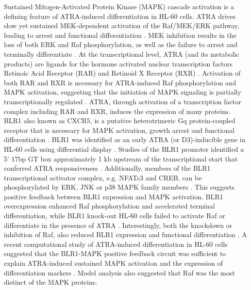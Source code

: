 \documentclass[12pt]{article}
\begin{document}
Sustained Mitogen-Activated Protein Kinase (MAPK) cascade
activation is a defining feature of ATRA-induced differentiation in HL-60 cells. 
ATRA drives slow yet sustained MEK-dependent activation of the Raf/MEK/ERK pathway, 
leading to arrest and functional differentiation \cite{Yen1998}.
MEK inhibition results in the loss of both ERK and Raf phosphorylation, 
as well as the failure to arrest and terminally differentiate \cite{Yen1998,Hong2001}.
At the transcriptional level, 
ATRA (and its metabolic products) are ligands for the hormone activated nuclear transcription factors Retinoic Acid Receptor (RAR) and Retinoid X Receptor (RXR) \cite{Mangelsdorf1990}.
Activation of both RAR and RXR is necessary for ATRA-induced Raf phosphorylation and MAPK activation,
suggesting that the initiation of MAPK signaling is partially transcriptionally regulated \cite{Hong2001}.
ATRA, through activation of a transcription factor complex including RAR and RXR, induces the expression of many proteins.
BLR1 also known as CXCR5, is a putative heterotrimeric Gq protein-coupled receptor 
that is necessary for MAPK activation, growth arrest and functional differentiation \cite{YEN1990,LIPP1994,WANG2004}.
BLR1 was identified as an early ATRA (or D3)-inducible gene in HL-60 cells using differential display \cite{YEN1990}. 
Studies of the BLR1 promoter identified a 5' 17bp GT box approximately 1 kb upstream of the transcriptional start that conferred ATRA responsiveness \cite{WANG2004}.
Additionally, members of the BLR1 transcriptional activator complex, e.g. NFATc3 and CREB, 
can be phosphorylated by ERK, JNK or p38 MAPK family members \cite{Yang2002}.
This suggests positive feedback between BLR1 expression and MAPK activation. 
BLR1 overexpression enhanced Raf phosphorylation and accelerated terminal differentiation, 
while BLR1 knock-out HL-60 cells failed to activate Raf or differentiate in the presence of ATRA \cite{Wang2008}.
Interestingly, both the knockdown or inhibition of Raf, also reduced BLR1 expression and functional differentiation \cite{Wang2008}.
A recent computational study of ATRA-induced differentiation in HL-60 cells suggested that the BLR1-MAPK positive feedback circuit was sufficient to explain ATRA-induced sustained MAPK activation and the expression of differentiation markers \cite{Tasseff2011}. 
Model analysis also suggested that Raf was the most distinct of the MAPK proteins.
\end{document}
